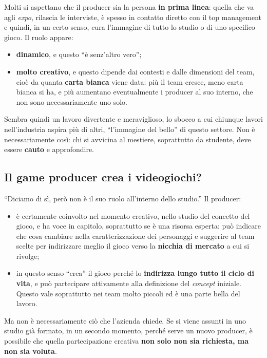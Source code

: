 Molti si aspettano che il producer sia la persona \textbf{in prima linea}:
quella che va agli \emph{expo}, rilascia le interviste, è spesso in contatto
diretto con il top management e quindi, in un certo senso, cura l'immagine di
tutto lo studio o di uno specifico gioco. Il ruolo appare:
\begin{itemize}
  \item \textbf{dinamico}, e questo ``è senz'altro vero'';
  \item \textbf{molto creativo}, e questo dipende dai contesti e dalle
        dimensioni del team, cioè da quanta \textbf{carta bianca} viene data:
        più il team cresce, meno carta bianca si ha, e più aumentano
        eventualmente i producer al suo interno, che non sono necessariamente
        uno solo.
\end{itemize}
Sembra quindi un lavoro divertente e meraviglioso, lo sbocco a cui chiunque
lavori nell'industria aspira più di altri, ``l'immagine del bello'' di questo
settore. Non è necessariamente così: chi si avvicina al mestiere, soprattutto da
studente, deve essere \textbf{cauto} e approfondire.

\subsection{Il game producer crea i videogiochi?}

``Diciamo di sì, però non è il suo ruolo all'interno dello studio.'' Il
producer:
\begin{itemize}
  \item è certamente coinvolto nel momento creativo, nello studio del concetto
        del gioco, e ha voce in capitolo, soprattutto se è una risorsa esperta:
        può indicare che cosa cambiare nella caratterizzazione dei personaggi e
        suggerire al team scelte per indirizzare meglio il gioco verso la
        \textbf{nicchia di mercato} a cui si rivolge;
  \item in questo senso ``crea'' il gioco perché lo \textbf{indirizza lungo
        tutto il ciclo di vita}, e può partecipare attivamente alla definizione
        del \emph{concept} iniziale. Questo vale soprattutto nei team molto
        piccoli ed è una parte bella del lavoro.
\end{itemize}
Ma non è necessariamente ciò che l'azienda chiede. Se si viene assunti in uno
studio già formato, in un secondo momento, perché serve un nuovo producer, è
possibile che quella partecipazione creativa \textbf{non solo non sia richiesta,
ma non sia voluta}.

